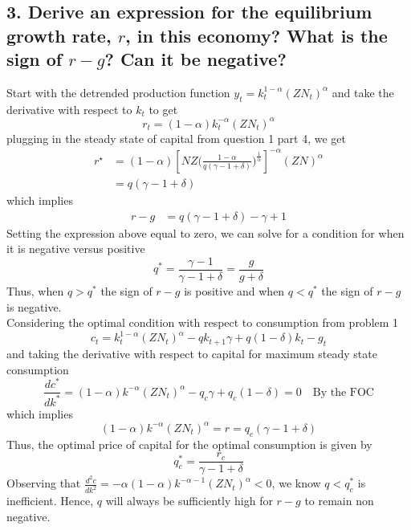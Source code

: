 \documentclass[10pt,letter]{article}
\begin{document}
\subsection*{3. Derive an expression for the equilibrium growth rate, $r$, in this economy? What is the sign of $r-g$? Can it be negative?}
Start with the detrended production function $y_t = k_t^{1-\alpha}(ZN_t)^\alpha$ and take the derivative with respect to $k_t$ to get 
\begin{equation*}
	r_t = (1-\alpha)k_t^{-\alpha}(ZN_t)^{\alpha}
\end{equation*}
plugging in the steady state of capital from question 1 part 4, we get 
\begin{equation*}
\begin{split}
	r^\star &= (1-\alpha)\left[NZ\bigg(\frac{1-\alpha}{q(\gamma-1+\delta)}\bigg)^{\frac{1}{\alpha}}\right]^{-\alpha}(ZN)^\alpha\\
	&= q(\gamma-1+\delta)
\end{split}
\end{equation*}
which implies 
\begin{equation}
	\begin{split}
	r - g &= q(\gamma - 1 + \delta)-\gamma +1
	\end{split}
	\label{eq:r_minus_g}
\end{equation}
Setting the expression above equal to zero, we can solve for a condition for when it is negative versus positive
\begin{equation*}
	q^* = \frac{\gamma-1}{\gamma-1+\delta} = \frac{g}{g+\delta}
\end{equation*}
Thus, when $q>q^*$ the sign of $r-g$ is positive and when $q<q^*$ the sign of $r-g$ is negative. \\

Considering the optimal condition with respect to consumption from problem 1
\begin{equation*}
c_t	 = k_t^{1 - \alpha} (ZN_t)^\alpha - qk_{t+1}\gamma + q (1-\delta) k_t - g_t
\end{equation*}
and taking the derivative with respect to capital for maximum steady state consumption 
\begin{equation*}
	\frac{dc^*}{dk^*} = (1-\alpha)k^{-\alpha}(ZN_t)^\alpha - q_c \gamma + q_c(1-\delta) = 0 \quad \text{By the FOC}
\end{equation*}
which implies 
\begin{equation*}
	(1-\alpha)k^{-\alpha}(ZN_t)^\alpha=r = q_c(\gamma - 1 + \delta)
\end{equation*}
Thus, the optimal price of capital for the optimal consumption is given by 
\begin{equation*}
	q_c^* = \frac{r_c}{\gamma - 1 + \delta}
\end{equation*}
Observing that $\frac{d^2c}{dk^2}=-\alpha (1-\alpha)k^{-\alpha-1}(ZN_t)^\alpha<0$, we know $q < q_c^*$ is inefficient. Hence, $q$ will always be sufficiently high for $r-g$ to remain non negative.  
\end{document}
